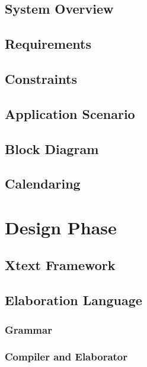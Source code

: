\documentclass{report}
\begin{document}
    \subsection{System Overview}
    
    \subsection{Requirements}
    
    \subsection{Constraints}
    
    \subsection{Application Scenario}
    
    \subsection{Block Diagram}
    
    \subsection{Calendaring}
    
    \section{Design Phase}
    
    \subsection{Xtext Framework}
    
    \subsection{Elaboration Language}
    
    \subsubsection{Grammar}
    
    \subsubsection{Compiler and Elaborator}
   
\end{document}
